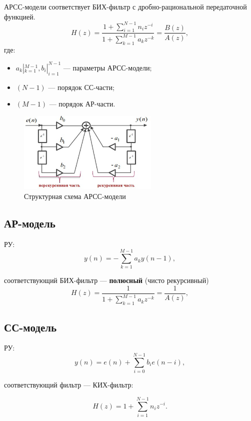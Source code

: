 \documentclass[a4paper, 14pt]{extarticle}
\begin{document}
АРСС-модели соответствует БИХ-фильтр с дробно-рациональной передаточной функцией.
\begin{equation}
    H(z) = \frac{1 + \sum^{N-1}_{i=1} n_i z^{-i}}{1 + \sum^{M-1}_{k=1} a_k z^{-k}} = \frac{B(z)}{A(z)},
\end{equation}
где:
\begin{itemize}
    \item $a_k |^{M-1}_{k=1}, b_i |^{N-1}_{i=1}$ --- параметры АРСС-модели;
    \item $(N-1)$ --- порядок СС-части;
    \item $(M-1)$ --- порядок АР-части.
\end{itemize}
\begin{figure}[h]
    \centering
    \includegraphics[width=0.6\textwidth]{img/S012.jpg}
    \caption{Структурная схема АРСС-модели}%
\end{figure}

\subsection{АР-модель}
РУ:
\begin{equation}
    y(n) = - \sum^{M-1}_{k=1} a_k y(n-1),
\end{equation}

соответствующий БИХ-фильтр --- \textbf{полюсный} (чисто рекурсивный)
\begin{equation}
    H(z) = \frac{1}{1 + \sum^{M-1}_{k=1} a_k z^{-k}} = \frac{1}{A(z)},
\end{equation}

\subsection{СС-модель}
РУ:
\begin{equation}
    y(n) = e(n) + \sum^{N-1}_{i=0} b_i e(n-i),
\end{equation}

соответствующий фильтр --- КИХ-фильтр:

\begin{equation}
    H(z) = 1 + \sum^{N-1}_{i=1} n_i z^{-i}.
\end{equation}
\end{document}
